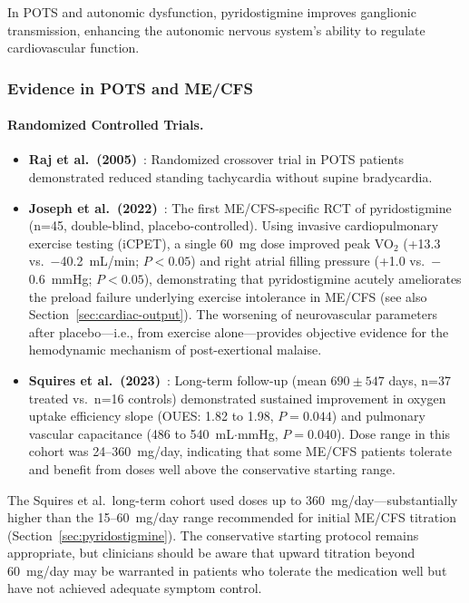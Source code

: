 In POTS and autonomic dysfunction, pyridostigmine improves ganglionic transmission, enhancing the autonomic nervous system's ability to regulate cardiovascular function.

\subsubsection{Evidence in POTS and ME/CFS}

\paragraph{Randomized Controlled Trials.}
\begin{itemize}
    \item \textbf{Raj et al.\ (2005)}~\cite{Raj2005Pyridostigmine}: Randomized crossover trial in POTS patients demonstrated reduced standing tachycardia without supine bradycardia.

    \item \textbf{Joseph et al.\ (2022)}~\cite{Joseph2022pyridostigmine}: The first ME/CFS-specific RCT of pyridostigmine (n=45, double-blind, placebo-controlled). Using invasive cardiopulmonary exercise testing (iCPET), a single 60~mg dose improved peak VO$_2$ (+13.3 vs.\ $-$40.2~mL/min; $P<0.05$) and right atrial filling pressure (+1.0 vs.\ $-$0.6~mmHg; $P<0.05$), demonstrating that pyridostigmine acutely ameliorates the preload failure underlying exercise intolerance in ME/CFS (see also Section~\ref{sec:cardiac-output}). The worsening of neurovascular parameters after placebo---i.e., from exercise alone---provides objective evidence for the hemodynamic mechanism of post-exertional malaise.

    \item \textbf{Squires et al.\ (2023)}~\cite{Squires2023pyridostigmine}: Long-term follow-up (mean $690 \pm 547$ days, n=37 treated vs.\ n=16 controls) demonstrated sustained improvement in oxygen uptake efficiency slope (OUES: 1.82 to 1.98, $P=0.044$) and pulmonary vascular capacitance (486 to 540~mL$\cdot$mmHg, $P=0.040$). Dose range in this cohort was 24--360~mg/day, indicating that some ME/CFS patients tolerate and benefit from doses well above the conservative starting range.
\end{itemize}

\begin{warning}
The Squires et al.\ long-term cohort used doses up to 360~mg/day---substantially higher than the 15--60~mg/day range recommended for initial ME/CFS titration (Section~\ref{sec:pyridostigmine}). The conservative starting protocol remains appropriate, but clinicians should be aware that upward titration beyond 60~mg/day may be warranted in patients who tolerate the medication well but have not achieved adequate symptom control.
\end{warning}

